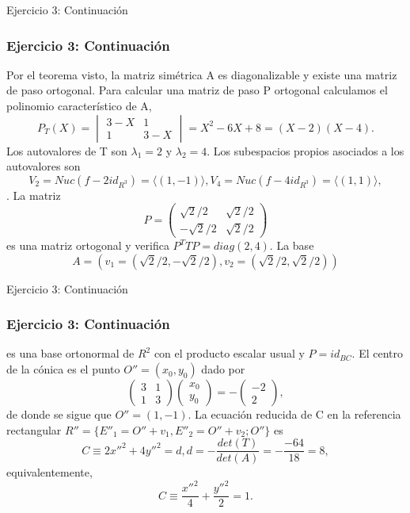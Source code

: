 \documentclass[xcolor={dvipsnames},aspectratio=169,10pt]{beamer}
\begin{document}
\begin{frame}{Ejercicio 3: Continuación}
  \frametitle{Ejercicio 3: Continuación}
    Por el teorema visto, la matriz simétrica A es diagonalizable y existe una matriz de paso ortogonal. Para calcular una matriz de paso P ortogonal calculamos el polinomio característico de A,
    \[P_T(X) = \begin{vmatrix} 3 - X & 1 \\ 1 & 3 - X \end{vmatrix} = X^2 - 6X + 8 = (X - 2)(X - 4).\]
    Los autovalores de T son $\lambda_1 = 2$ y $\lambda_2 = 4$. Los subespacios propios asociados a los autovalores son
    \[V_2 = Nuc (f - 2 id_{R^3}) = \langle(1, -1)\rangle, V_4 = Nuc (f - 4 id_{R^3}) = \langle(1, 1)\rangle,\]
    . La matriz
    \[P = \begin{pmatrix} \sqrt{2}/2 & \sqrt{2}/2 \\ -\sqrt{2}/2 & \sqrt{2}/2 \end{pmatrix}\]
    es una matriz ortogonal y verifica $P^T T P = diag (2, 4)$. La base
    \[A = (v_1 = (\sqrt{2}/2, -\sqrt{2}/2), v_2 = (\sqrt{2}/2, \sqrt{2}/2))\]
\end{frame}

\begin{frame}{Ejercicio 3: Continuación}
  \frametitle{Ejercicio 3: Continuación}
    es una base ortonormal de $R^2$ con el producto escalar usual y $P = id_{BC}$. El centro de la cónica es el punto $O'' = (x_0, y_0)$ dado por 
    \[\begin{pmatrix} 3 & 1 \\ 1 & 3 \end{pmatrix} \begin{pmatrix} x_0 \\ y_0 \end{pmatrix} = -\begin{pmatrix} -2 \\ 2 \end{pmatrix},\]
    de donde se sigue que $O'' = (1, -1)$. La ecuación reducida de C en la referencia rectangular $R'' = \{E''_1 = O'' + v_1, E''_2 = O'' + v_2; O''\}$ es
    \[C \equiv 2 x''^2 + 4 y''^2 = d, d = - \frac{det(T)}{det(A)} = - \frac{-64}{18} = 8,\]
    equivalentemente,
    \[C \equiv \frac{x''^2}{4} + \frac{y''^2}{2} = 1.\]
\end{frame}
\end{document}
